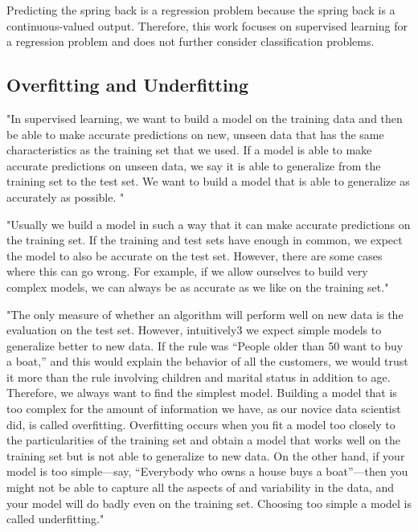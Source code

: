 Predicting the spring back is a regression problem because the spring back is a continuous-valued output. 
Therefore, this work focuses on supervised learning for a regression problem and does not further consider classification problems.

\subsection{Overfitting and Underfitting}
"In supervised learning, we want to build a model on the training data
and then be able to make accurate predictions on new, unseen data that
has the same characteristics as the training set that we used. If a
model is able to make accurate predictions on unseen data, we say it is
able to generalize from the training set to the test set. We want to
build a model that is able to generalize as accurately as possible. " \cite[p. 35]{muller_introductionmachinelearning_2016}

"Usually we build a model in such a way that it can make accurate
predictions on the training set. If the training and test sets have
enough in common, we expect the model to also be accurate on the test
set. However, there are some cases where this can go wrong. For example,
if we allow ourselves to build very complex models, we can always be as
accurate as we like on the training set." 
\cite[p. 35]{muller_introductionmachinelearning_2016}

"The only measure of whether an algorithm will perform well on new data
is the evaluation on the test set. However, intuitively3 we expect simple models to generalize
better to new data. If the rule was “People older than 50 want to buy a
boat,” and this would explain the behavior of all the
customers, we would trust it more than the rule involving children and
marital status in addition to age. Therefore, we always want to find
the simplest model. Building a model that is too complex for the amount
of information we have, as our novice data scientist did, is called
overfitting. Overfitting occurs when you fit a model too closely to
the particularities of the training set and obtain a model that works
well on the training set but is not able to generalize to new data. On
the other hand, if your model is too simple—say, “Everybody who owns a
house buys a boat”—then you might not be able to capture all the
aspects of and variability in the data, and your model will do badly even
on the training set. Choosing too simple a model is called
underfitting."  \cite[p. 35]{muller_introductionmachinelearning_2016}

